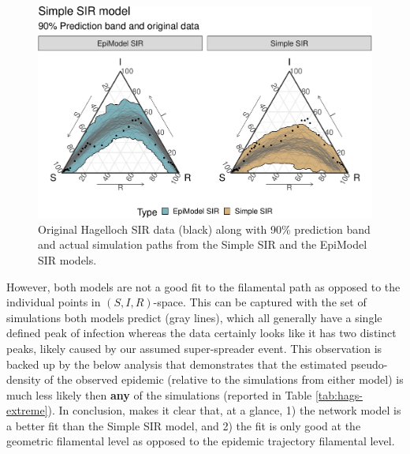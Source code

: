 \documentclass[
  shortnames]{jss}
\begin{document}
\begin{CodeChunk}
\begin{figure}[H]

{\centering \includegraphics{Figs/unnamed-chunk-17-1} 

}

\caption{\label{fig:hag-simple-sir}  Original Hagelloch SIR data (black) along with 90\% prediction band and actual simulation paths from the Simple SIR and the EpiModel SIR models.}\label{fig:unnamed-chunk-17}
\end{figure}
\end{CodeChunk}

However, both models are not a good fit to the filamental path as
opposed to the individual points in \((S, I, R)\)-space. This can be
captured with the set of simulations both models predict (gray lines),
which all generally have a single defined peak of infection whereas the
data certainly looks like it has two distinct peaks, likely caused by
our assumed super-spreader event. This observation is backed up by the
below analysis that demonstrates that the estimated pseudo-density of
the observed epidemic (relative to the simulations from either model) is
much less likely then \textbf{any} of the simulations (reported in Table
\ref{tab:hags-extreme}). In conclusion,  makes it clear
that, at a glance, 1) the  network model is a better fit
than the Simple SIR model, and 2) the fit is only good at the geometric
filamental level as opposed to the epidemic trajectory filamental level.
\end{document}
